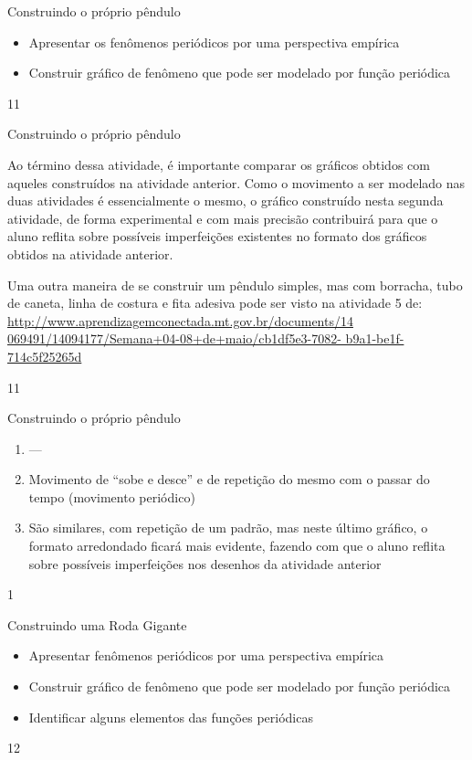 \clearmargin
\clearmargin
\begin{objectives}{Construindo o próprio pêndulo}
{
\begin{itemize}
\item Apresentar os fenômenos periódicos por uma perspectiva
empírica
\item Construir gráfico de fenômeno que pode ser modelado por
função periódica
\end{itemize}
}{1}{1}
\end{objectives}
\begin{sugestions}{Construindo o próprio pêndulo}
{
Ao término dessa atividade, é importante comparar
os gráficos obtidos com aqueles construídos na atividade
anterior. Como o movimento a ser modelado nas duas
atividades é essencialmente o mesmo, o gráfico construído
nesta segunda atividade, de forma experimental e com mais
precisão contribuirá para que o aluno reflita sobre possíveis
imperfeições existentes no formato dos gráficos obtidos na
atividade anterior.

Uma outra maneira de se construir um pêndulo simples, mas
com borracha, tubo de caneta, linha de costura e fita adesiva
pode ser visto na atividade 5 de: \url{http://www.aprendizagemconectada.mt.gov.br/documents/14
069491/14094177/Semana+04-08+de+maio/cb1df5e3-7082-
b9a1-be1f-714c5f25265d}
}{1}{1}
\end{sugestions}
\clearmargin
\vspace{.5em}
\begin{answer}{Construindo o próprio pêndulo}
{
\begin{enumerate}
\item ---
\item Movimento de “sobe e desce”{} e de repetição do mesmo
com o passar do tempo (movimento periódico)
\item São similares, com repetição de um padrão, mas neste
último gráfico, o formato arredondado ficará mais evidente,
fazendo com que o aluno reflita sobre possíveis imperfeições
nos desenhos da atividade anterior
\end{enumerate}
}{1}
\end{answer}
\begin{objectives}{Construindo uma Roda Gigante}
{
\begin{itemize}
\item Apresentar fenômenos periódicos por uma perspectiva
empírica
\item Construir gráfico de fenômeno que pode ser modelado por
função periódica
\item Identificar alguns elementos das funções periódicas
\end{itemize}
}{1}{2}
\end{objectives}
